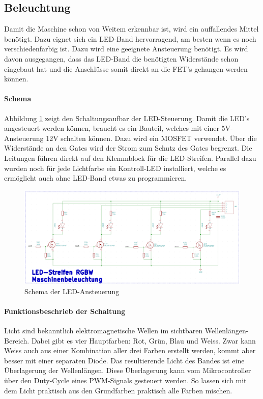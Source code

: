 \subsection{Beleuchtung}
\label{subsec:Beleuchtung_2}

Damit die Maschine schon von Weitem erkennbar ist, wird ein auffallendes Mittel benötigt. Dazu eignet sich ein LED-Band hervorragend, am besten wenn es noch verschiedenfarbig ist. Dazu wird eine geeignete Ansteuerung benötigt. Es wird davon ausgegangen, dass das LED-Band die benötigten Widerstände schon eingebaut hat und die Anschlüsse somit direkt an die FET's gehangen werden können.

\paragraph{Schema}\mbox{}

Abbildung \ref{fig:Schema_LED} zeigt den Schaltungsaufbar der LED-Steuerung. Damit die LED's angesteuert werden können, braucht es ein Bauteil, welches mit einer 5V-Ansteuerung 12V schalten können. Dazu wird ein MOSFET verwendet. Über die Widerstände an den Gates wird der Strom zum Schutz des Gates begrenzt. Die Leitungen führen direkt auf den Klemmblock für die LED-Streifen. Parallel dazu wurden noch für jede Lichtfarbe ein Kontroll-LED installiert, welche es ermöglicht auch ohne LED-Band etwas zu programmieren.

\begin{figure}[!h]
\center
\includegraphics[width =  \textwidth]{graphics/Schema_LED}
\caption{Schema der LED-Ansteuerung}
\label{fig:Schema_LED}
\end{figure}
\newpage
\paragraph{Funktionsbeschrieb der Schaltung}\mbox{}

Licht sind bekanntlich elektromagnetische Wellen im sichtbaren Wellenlängen-Bereich. Dabei gibt es vier Hauptfarben: Rot, Grün, Blau und Weiss. Zwar kann Weiss auch aus einer Kombination aller drei Farben erstellt werden, kommt aber besser mit einer separaten Diode. Das resultierende Licht des Bandes ist eine Überlagerung der Wellenlängen. Diese Überlagerung kann vom Mikrocontroller über den Duty-Cycle eines PWM-Signals gesteuert werden. So lassen sich mit dem Licht praktisch aus den Grundfarben praktisch alle Farben mischen.